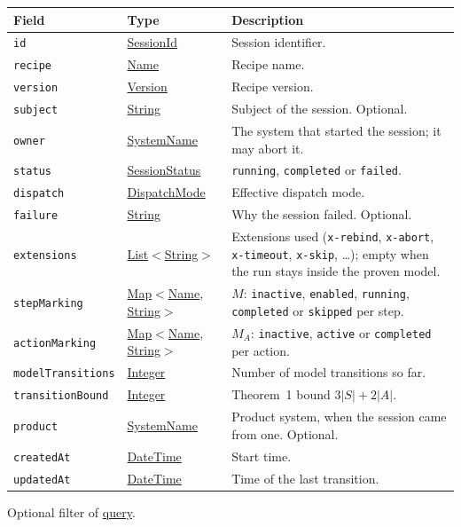\documentclass[a4paper]{arrowhead}
\newcommand{\mref}[1]{{\textcolor{ArrowheadPurple}{\hyperref[sec:model:#1]{#1}}}}
\newcommand{\oref}[1]{{\textcolor{ArrowheadBlue}{\hyperref[sec:operations:#1]{#1}}}}
\newcommand{\pref}[1]{{\textcolor{ArrowheadGrey}{\hyperref[sec:model:primitives:#1]{#1}}}}
\begin{document}
{\small
\begin{longtable}{|p{3.9cm}|p{4.4cm}|p{7.5cm}|}

\hline
\rowcolor{gray!33} Field & Type & Description \\ \hline
\endhead
\texttt{id} & \pref{SessionId} & Session identifier. \\ \hline
\texttt{recipe} & \pref{Name} & Recipe name. \\ \hline
\texttt{version} & \pref{Version} & Recipe version. \\ \hline
\texttt{subject} & \pref{String} & Subject of the session. Optional. \\ \hline
\texttt{owner} & \pref{SystemName} & The system that started the session; it may abort it. \\ \hline
\texttt{status} & \mref{SessionStatus} & \texttt{running}, \texttt{completed} or \texttt{failed}. \\ \hline
\texttt{dispatch} & \mref{DispatchMode} & Effective dispatch mode. \\ \hline
\texttt{failure} & \pref{String} & Why the session failed. Optional. \\ \hline
\texttt{extensions} & \pref{List}$<$\pref{String}$>$ & Extensions used (\texttt{x-rebind}, \texttt{x-abort}, \texttt{x-timeout}, \texttt{x-skip}, \ldots); empty when the run stays inside the proven model. \\ \hline
\texttt{stepMarking} & \pref{Map}$<$\pref{Name}, \pref{String}$>$ & $M$: \texttt{inactive}, \texttt{enabled}, \texttt{running}, \texttt{completed} or \texttt{skipped} per step. \\ \hline
\texttt{actionMarking} & \pref{Map}$<$\pref{Name}, \pref{String}$>$ & $M_A$: \texttt{inactive}, \texttt{active} or \texttt{completed} per action. \\ \hline
\texttt{modelTransitions} & \pref{Integer} & Number of model transitions so far. \\ \hline
\texttt{transitionBound} & \pref{Integer} & Theorem~1 bound $3|S| + 2|A|$. \\ \hline
\texttt{product} & \pref{SystemName} & Product system, when the session came from one. Optional. \\ \hline
\texttt{createdAt} & \pref{DateTime} & Start time. \\ \hline
\texttt{updatedAt} & \pref{DateTime} & Time of the last transition. \\ \hline
\end{longtable}
}

Optional filter of \oref{query}.
\end{document}
